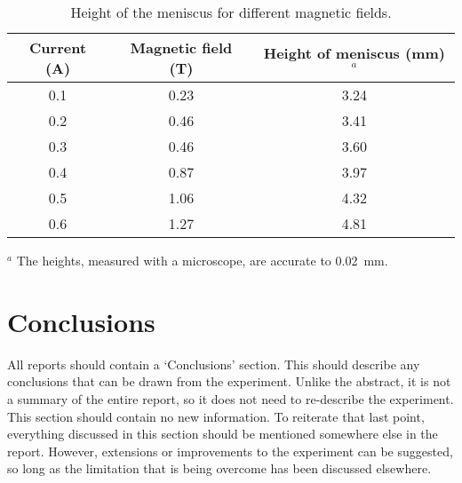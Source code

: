\documentclass[11pt]{article} %
\begin{document}
\begin{table} %

\begin{center}
\caption{Height of the meniscus for different magnetic fields.}
\label{tab:example}
\begin{tabular}{ccc}\hline %
Current (A) & Magnetic field (T) & Height of meniscus (mm)$^a$\\ \hline %
0.1 & 0.23  & 3.24\\
0.2 & 0.46  & 3.41\\ 
0.3 & 0.46  & 3.60\\ 
0.4 & 0.87  & 3.97\\ 
0.5 & 1.06  & 4.32\\ 
0.6 & 1.27  & 4.81\\ \hline
\end{tabular} %
\smallskip %

$^a$ The heights, measured with a microscope, are accurate to 0.02~mm. \\
\smallskip %

\end{center}
\end{table}


\section{Conclusions}
All reports should contain a `Conclusions' section. This should describe any conclusions that can be drawn from the experiment.
Unlike the abstract, it is not a summary of the entire report, so it does not need to re-describe the experiment. This section should contain no new information. To reiterate that last point, everything discussed in this section should be mentioned somewhere else in the report. However, extensions or improvements to the experiment can be suggested, so long as the limitation that is being overcome has been discussed elsewhere.\\


\end{document}
